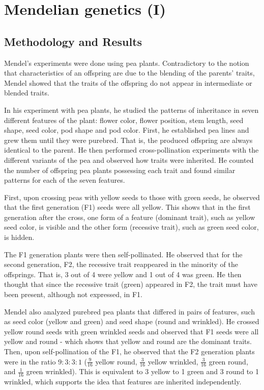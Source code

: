 \chapter{Mendelian genetics (I)}

\section{Methodology and Results}
Mendel’s experiments were done using pea plants.
Contradictory to the notion that characteristics of an offspring are due to the blending of the parents’ traits, Mendel showed that the traits of the offspring do not appear in intermediate or blended traits. 

In his experiment with pea plants, he studied the patterns of inheritance in seven different features of the plant: flower color, flower position, stem length, seed shape, seed color, pod shape and pod color.
First, he established pea lines and grew them until they were purebred.
That is, the produced offspring are always identical to the parent.
He then performed cross-pollination experiments with the different variants of the pea and observed how traits were inherited.
He counted the number of offspring pea plants possessing each trait and found similar patterns for each of the seven features.

First, upon crossing peas with yellow seeds to those with green seeds, he observed that the first generation (F1) seeds were all yellow.
This shows that in the first generation after the cross, one form of a feature (dominant trait), such as yellow seed color, is visible and the other form (recessive trait), such as green seed color, is hidden. 

The F1 generation plants were then self-pollinated.
He observed that for the second generation, F2, the recessive trait reappeared in the minority of the offsprings.
That is, 3 out of 4 were yellow and 1 out of 4 was green.
He then thought that since the recessive trait (green) appeared in F2, the trait must have been present, although not expressed, in F1.

Mendel also analyzed purebred pea plants that differed in pairs of features, such as seed color (yellow and green) and seed shape (round and wrinkled).
He crossed yellow round seeds with green wrinkled seeds and observed that F1 seeds were all yellow and round - which shows that yellow and round are the dominant traits.
Then, upon self-pollination of the F1, he observed that the F2 generation plants were in the ratio $9:3:3:1$ ($\frac{9}{16}$ yellow round, $\frac{3}{16}$ yellow wrinkled, $\frac{3}{16}$ green round, and $\frac{1}{16}$ green wrinkled).
This is equivalent to 3 yellow to 1 green and 3 round to 1 wrinkled, which supports the idea that features are inherited independently.

